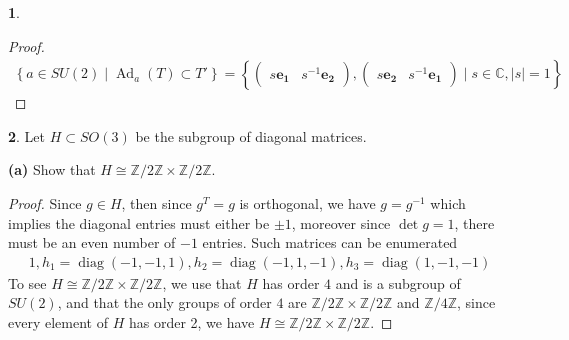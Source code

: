 \documentclass[10.5pt]{article}
\theoremstyle{definition}
\newtheorem{pb}{}
\newcommand{\set}[1]{\left\{#1\right\}}
\newcommand{\abs}[1]{\left\vert#1\right\vert}
\begin{document}
\begin{pb}
\begin{proof}
            \begin{align*}
                \set{a \in SU(2) \mid \operatorname{Ad}_a(T) \subset T'} = \set{\begin{pmatrix}
                    s\mathbf{e_1} & s^{-1}\mathbf{e_2}
                \end{pmatrix}, \begin{pmatrix}
                    s\mathbf{e_2} & s^{-1}\mathbf{e_1}
                \end{pmatrix} \mid s \in \mathbb{C}, \abs{s} = 1}
            \end{align*}
        \end{proof}
    \end{pb}
    \begin{pb}
        Let \(H \subset SO(3)\) be the subgroup of diagonal matrices.

        \textbf{(a)} Show that \(H \cong \mathbb{Z}/2 \mathbb{Z} \times \mathbb{Z}/ 2 \mathbb{Z}\).
        \begin{proof}
            Since \(g \in H\), then since \(g^T = g\) is orthogonal, we have \(g = g^{-1}\) which implies the diagonal entries must either be \(\pm 1\), moreover since \(\det g = 1\), there must be an even number of \(-1\) entries. Such matrices can be enumerated
            \begin{align*}
                1, h_1 = \operatorname{diag}(-1,-1,1), h_2 = \operatorname{diag}(-1,1,-1), h_3 = \operatorname{diag}(1,-1,-1)
            \end{align*}
            To see \(H \cong \mathbb{Z}/ 2 \mathbb{Z} \times \mathbb{Z} / 2 \mathbb{Z}\), we use that \(H\) has order \(4\) and is a subgroup of \(SU(2)\), and that the only groups of order \(4\) are \(\mathbb{Z}/2 \mathbb{Z} \times \mathbb{Z}/ 2 \mathbb{Z}\) and \(\mathbb{Z}/ 4 \mathbb{Z}\), since every element of \(H\) has order 2, we have \(H \cong \mathbb{Z}/2 \mathbb{Z} \times \mathbb{Z}/ 2 \mathbb{Z}\).
        \end{proof}


\end{pb}
\end{document}

